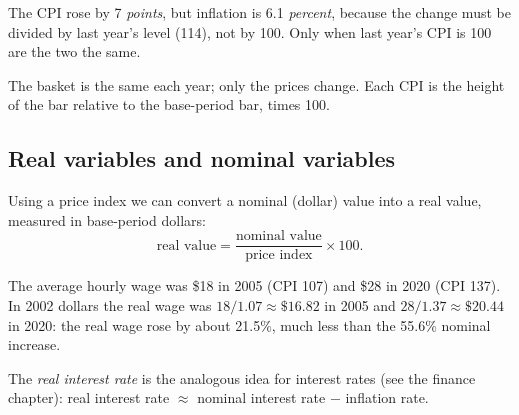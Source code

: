 \begin{important}
The CPI rose by 7 \emph{points}, but inflation is 6.1 \emph{percent}, because the
change must be divided by last year's level (114), not by 100. Only when last year's CPI
is 100 are the two the same.
\end{important}

\begin{center}
\end{center}
The basket is the same each year; only the prices change. Each CPI is the height of the bar
relative to the base-period bar, times 100.

\subsection{Real variables and nominal variables}

Using a price index we can convert a nominal (dollar) value into a real value, measured
in base-period dollars:
\[
  \text{real value} = \frac{\text{nominal value}}{\text{price index}} \times 100.
\]

\begin{example}
The average hourly wage was \$18 in 2005 (CPI 107) and \$28 in 2020 (CPI 137). In 2002
dollars the real wage was $18/1.07 \approx \$16.82$ in 2005 and $28/1.37 \approx \$20.44$
in 2020: the real wage rose by about 21.5\%, much less than the 55.6\% nominal increase.
\end{example}

The \emph{real interest rate} is the analogous idea for interest rates (see the finance
chapter): real interest rate $\approx$ nominal interest rate $-$ inflation rate.

